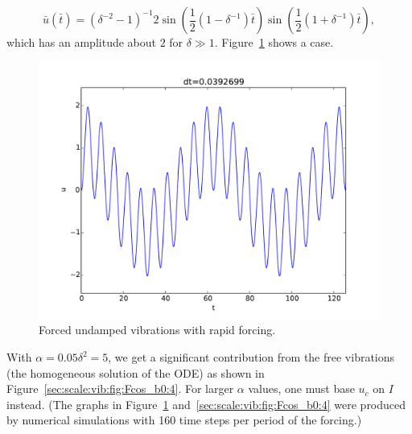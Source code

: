 \documentclass[graybox,envcountchap,sectrefs,final]{svmonodo}
\begin{document}
\[ \bar u(\bar t) = (\delta^{-2}-1)^{-1}2
\sin\left(\frac{1}{2}(1 -\delta^{-1})\bar t\right)
\sin\left(\frac{1}{2}(1 +\delta^{-1})\bar t\right),
\]
which has an amplitude about $2$ for $\delta\gg 1$.
Figure~\ref{sec:scale:vib:fig:Fcos_b0:3} shows a case.



\begin{figure}[!ht]  %
  \centerline{\includegraphics[width=1.0\linewidth]{fig-scaling/vib_delta10_b0_Fcos.pdf}}
  \caption{
  Forced undamped vibrations with rapid forcing. \label{sec:scale:vib:fig:Fcos_b0:3}
  }
\end{figure}


With $\alpha=0.05\delta^2=5$, we get a significant contribution from
the free vibrations (the homogeneous solution of the ODE) as
shown in Figure~\ref{sec:scale:vib:fig:Fcos_b0:4}. For larger $\alpha$
values, one must base $u_c$ on $I$ instead.
(The graphs in Figure~\ref{sec:scale:vib:fig:Fcos_b0:3} and~\ref{sec:scale:vib:fig:Fcos_b0:4} were
produced by
numerical simulations with 160 time steps per period of the forcing.)
\end{document}
